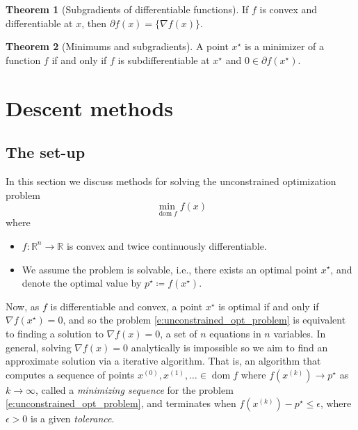 \documentclass[11pt]{amsart}
\theoremstyle{definition}
\newtheorem{theorem}{Theorem}[section]
\theoremstyle{remark}
\DeclareMathOperator{\domain}{dom}
\begin{document}
        \begin{theorem}[Subgradients of differentiable functions]\label{t:subgrads_of_diff_functions}
            If $f$ is convex and differentiable at $x$, then $\partial f(x) = \{ \nabla f(x)\}$.
        \end{theorem}

        \begin{theorem}[Minimums and subgradients]\label{t:minimums_and_subgrads}
            A point $x^\star$ is a minimizer of a function $f$ if and only if $f$ is subdifferentiable at $x^\star$ and $0 \in \partial f(x^\star)$.
        \end{theorem}

\section{Descent methods}
    \subsection{The set-up}
        In this section we discuss methods for solving the unconstrained optimization problem 
        \begin{equation*}\label{e:unconstrained_opt_problem}
            \min_{\domain f} f(x)
        \end{equation*}
        where 
        \begin{itemize}
            \item $f: \mathbb{R}^n \to \mathbb{R}$ is convex and twice continuously differentiable.
            \item We assume the problem is solvable, i.e., there exists an optimal point $x^\star$, and denote the optimal value by $p^\star \coloneqq f(x^\star)$.
        \end{itemize} 
        Now, as $f$ is differentiable and convex, a point $x^\star$ is optimal if and only if $\nabla f(x^\star) = 0$, and so the problem \eqref{e:unconstrained_opt_problem} is equivalent to finding a solution to $\nabla f(x) = 0$, a set of $n$ equations in $n$ variables. In general, solving $\nabla f(x) = 0$ analytically is impossible so we aim to find an approximate solution via a iterative algorithm. That is, an algorithm that computes a sequence of points $x^{(0)}, x^{(1)}, \dots \in \domain f$ where $f(x^{(k)}) \to p^\star$ as $k \to \infty$, called  a \emph{minimizing sequence} for the problem \eqref{e:unconstrained_opt_problem}, and terminates when $f(x^{(k)}) - p^\star \leq \epsilon$, where $\epsilon > 0$ is a given \emph{tolerance}. 
\end{document}
